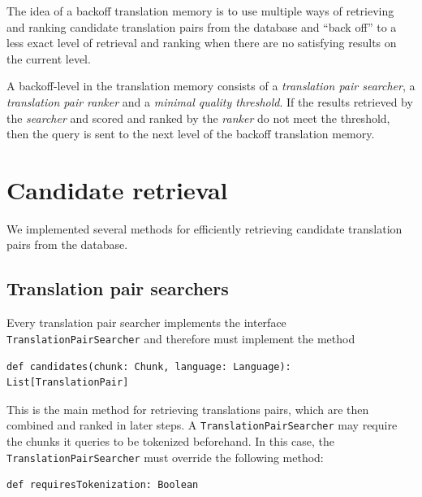 The idea of a backoff translation memory is to use multiple ways of
retrieving and ranking candidate translation pairs from the database and
``back off'' to a less exact level of retrieval and ranking when there
are no satisfying results on the current level.

A backoff-level in the translation memory consists of a \emph{translation pair
searcher}, a \emph{translation pair ranker} and a \emph{minimal quality
threshold}. 
If the results retrieved by the \emph{searcher} and scored and ranked by
the \emph{ranker} do not meet the threshold, then the query is sent to the 
next level of the backoff translation memory. 


\section{Candidate retrieval}
\label{sec:candidate_retrieval}

We implemented several methods for efficiently retrieving candidate
translation pairs from the database. 


\subsection{Translation pair searchers}

Every translation pair searcher implements the interface {\tt TranslationPairSearcher} and therefore must implement the method 

\vspace*{0.5em}

\begin{lstlisting}
def candidates(chunk: Chunk, language: Language): List[TranslationPair]
\end{lstlisting}

This is the main method for retrieving translations pairs, which are then combined and ranked in later steps. A {\tt TranslationPairSearcher} may require the chunks it queries to be tokenized beforehand. In this case, the {\tt TranslationPairSearcher} must override the following method:

\vspace*{0.5em}

\begin{lstlisting}
def requiresTokenization: Boolean
\end{lstlisting}

